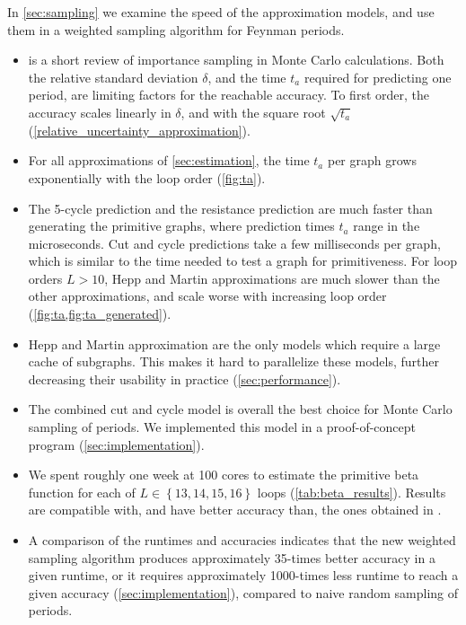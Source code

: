 \documentclass[11pt]{scrartcl}
\numberwithin{equation}{section}
\begin{document}
\medskip
\noindent
In \cref{sec:sampling} we examine the speed of the approximation models, and   use them in a weighted sampling algorithm for Feynman periods. 
\begin{itemize}
	\item {} is a short review of importance sampling in Monte Carlo calculations.  Both the relative standard deviation $\delta$, and the time  $t_a$ required for predicting one period, are limiting factors for the reachable accuracy. To first order, the accuracy scales linearly in $\delta$, and with the square root $\sqrt{t_a}$ (\cref{relative_uncertainty_approximation}).
	\item For all approximations of \cref{sec:estimation}, the time $t_a$ per graph grows exponentially with the loop order (\cref{fig:ta}). 
	\item The 5-cycle prediction and the resistance prediction are much faster than generating the primitive graphs, where prediction times $t_a$ range in the microseconds. Cut and cycle predictions  take a few milliseconds per graph, which is similar to the time needed to test a graph for primitiveness. For  loop orders $L >10$, Hepp and Martin approximations are much slower than the other approximations, and scale worse with increasing loop order (\cref{fig:ta,fig:ta_generated}).
	\item Hepp and Martin approximation are the only models which require a large cache of subgraphs. This makes it hard to parallelize these models, further decreasing their usability in practice (\cref{sec:performance}).
	\item The combined cut and cycle model is overall the best choice for Monte Carlo sampling of periods. We implemented this model in a proof-of-concept program (\cref{sec:implementation}).
	\item We spent roughly one week at 100 cores to estimate the primitive beta function for each of $L\in \left \lbrace 13,14,15,16 \right \rbrace $ loops (\cref{tab:beta_results}). Results are compatible with, and have better accuracy than, the ones obtained in   \cite{balduf_statistics_2023}.
	\item  A  comparison of the runtimes and accuracies indicates that the new weighted sampling algorithm produces approximately 35-times better accuracy in a given runtime, or it requires approximately 1000-times less runtime to reach a given accuracy (\cref{sec:implementation}), compared to naive random sampling of periods.
\end{itemize}
\end{document}

